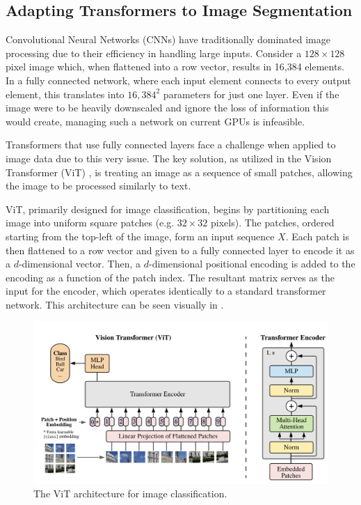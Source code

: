  \subsection{Adapting Transformers to Image Segmentation}
 
 Convolutional Neural Networks (CNNs) have traditionally dominated image processing due to their efficiency in handling large inputs. Consider a $128 \times 128$ pixel image which, when flattened into a row vector, results in 16,384 elements. In a fully connected network, where each input element connects to every output element, this translates into $16,384^2$ parameters for just one layer. Even if the image were to be heavily downscaled and ignore the loss of information this would create, managing such a network on current GPUs is infeasible.
 
 Transformers that use fully connected layers face a challenge when applied to image data due to this very issue. The key solution, as utilized in the Vision Transformer (ViT) \cite{dosovitskiy2021an}, is treating an image as a sequence of small patches, allowing the image to be processed similarly to text.
 
 ViT, primarily designed for image classification, begins by partitioning each image into uniform square patches (e.g. $32 \times 32$ pixels). The patches, ordered starting from the top-left of the image, form an input sequence $X$. Each patch is then flattened to a row vector and given to a fully connected layer to encode it as a $d$-dimensional vector. Then, a $d$-dimensional positional encoding is added to the encoding as a function of the patch index. The resultant matrix serves as the input for the encoder, which operates identically to a standard transformer network. This architecture can be seen visually in .
 
  \begin{figure}[t!]
 \centering
 \includegraphics[width=\linewidth]{images/vit-arch}
 \caption{The ViT architecture for image classification. \cite{dosovitskiy2021an}}
 \label{fig:vit-arch}
 \end{figure}
 
